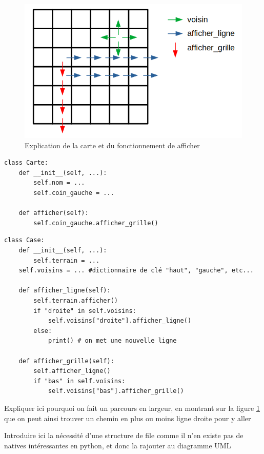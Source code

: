 \begin{figure}
    \includegraphics[scale=0.5]{Developpements/Illustration oriente objet/explication carte.png}
    \caption{Explication de la carte et du fonctionnement de afficher}
	\label{carteobj1}
\end{figure}

\begin{lstlisting}
class Carte:
    def __init__(self, ...):
        self.nom = ...
        self.coin_gauche = ...
    
    def afficher(self):
        self.coin_gauche.afficher_grille()    
\end{lstlisting}

\begin{lstlisting}
class Case:
    def __init__(self, ...):
        self.terrain = ...
    self.voisins = ... #dictionnaire de clé "haut", "gauche", etc...
    
    def afficher_ligne(self):
        self.terrain.afficher()
        if "droite" in self.voisins:
            self.voisins["droite"].afficher_ligne()
        else:
            print() # on met une nouvelle ligne
    
    def afficher_grille(self):
        self.afficher_ligne()
        if "bas" in self.voisins:
            self.voisins["bas"].afficher_grille()
\end{lstlisting}

\begin{com}
	Expliquer ici pourquoi on fait un parcours en largeur, en montrant sur la figure \ref{carteobj1} que on peut ainsi trouver un chemin en plus ou moins ligne droite pour y aller	
\end{com}

\begin{com}
	Introduire ici la nécessité d'une structure de file comme il n'en existe pas de natives intéressantes en python, et donc la rajouter au diagramme UML
\end{com}

